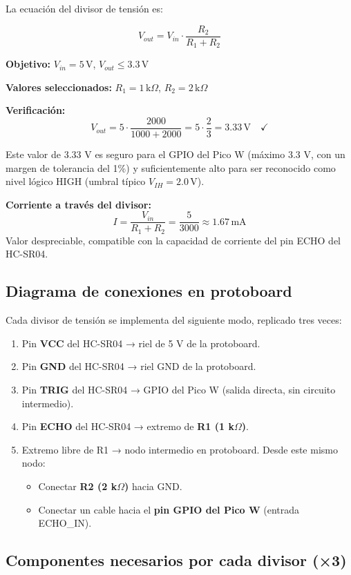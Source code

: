\documentclass[12pt]{report}
\begin{document}
La ecuación del divisor de tensión es:

\[
V_{out} = V_{in} \cdot \frac{R_2}{R_1 + R_2}
\]

\textbf{Objetivo:} $V_{in} = 5\,\text{V}$, $V_{out} \leq 3.3\,\text{V}$

\textbf{Valores seleccionados:} $R_1 = 1\,\text{k}\Omega$, $R_2 = 2\,\text{k}\Omega$

\textbf{Verificación:}
\[
V_{out} = 5 \cdot \frac{2000}{1000 + 2000} = 5 \cdot \frac{2}{3} = 3.33\,\text{V} \quad \checkmark
\]

Este valor de 3.33 V es seguro para el GPIO del Pico W (máximo 3.3 V, con un margen de tolerancia del 1\%) y suficientemente alto para ser reconocido como nivel lógico HIGH (umbral típico $V_{IH} = 2.0\,\text{V}$).

\textbf{Corriente a través del divisor:}
\[
I = \frac{V_{in}}{R_1 + R_2} = \frac{5}{3000} \approx 1.67\,\text{mA}
\]
Valor despreciable, compatible con la capacidad de corriente del pin ECHO del HC-SR04.

\subsection{Diagrama de conexiones en protoboard}

Cada divisor de tensión se implementa del siguiente modo, replicado tres veces:

\begin{enumerate}
    \item Pin \textbf{VCC} del HC-SR04 → riel de 5 V de la protoboard.
    \item Pin \textbf{GND} del HC-SR04 → riel GND de la protoboard.
    \item Pin \textbf{TRIG} del HC-SR04 → GPIO del Pico W (salida directa, sin circuito intermedio).
    \item Pin \textbf{ECHO} del HC-SR04 → extremo de \textbf{R1 (1 k$\Omega$)}.
    \item Extremo libre de R1 → nodo intermedio en protoboard. Desde este mismo nodo:
    \begin{itemize}
        \item Conectar \textbf{R2 (2 k$\Omega$)} hacia GND.
        \item Conectar un cable hacia el \textbf{pin GPIO del Pico W} (entrada ECHO\_IN).
    \end{itemize}
\end{enumerate}

\subsection{Componentes necesarios por cada divisor (×3)}
\end{document}
